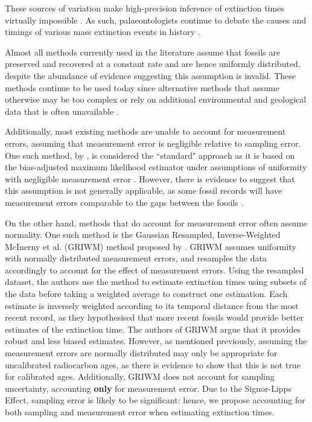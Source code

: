 These sources of variation make high-precision inference of extinction times virtually impossible \cite{Bradshaw2012}. As such, palaeontologists continue to debate the causes and timings of various mass extinction events in history \cite{Saltre2015}.

Almost all methods currently used in the literature assume that fossils are preserved and recovered at a constant rate and are hence uniformly distributed, despite the abundance of evidence suggesting this assumption is invalid. These methods continue to be used today since alternative methods that assume otherwise may be too complex or rely on additional environmental and geological data that is often unavailable \cite{WangMarshall2016}.

Additionally, most existing methods are unable to account for measurement errors, assuming that measurement error is negligible relative to sampling error. One such method, by \citet{Strauss1989}, is considered the ``standard" approach as it is based on the bias-adjusted maximum likelihood estimator under assumptions of uniformity with negligible measurement error \cite{WangMarshall2016}. However, there is evidence to suggest that this assumption is not generally applicable, as some fossil records will have measurement errors comparable to the gaps between the fossils \cite{Solow2006}.

On the other hand, methods that do account for measurement error often assume normality. One such method is the Gaussian Resampled, Inverse-Weighted McInerny et al. (GRIWM) method proposed by \citet{Bradshaw2012}. GRIWM assumes uniformity with normally distributed measurement errors, and resamples the data accordingly to account for the effect of measurement errors. Using the resampled dataset, the authors use the \citet{Mcinerny2006} method to estimate extinction times using subsets of the data before taking a weighted average to construct one estimation. Each estimate is inversely weighted according to its temporal distance from the most recent record, as they hypothesised that more recent fossils would provide better estimates of the extinction time. The authors of GRIWM argue that it provides robust and less biased estimates. However, as mentioned previously, assuming the measurement errors are normally distributed may only be appropriate for uncalibrated radiocarbon ages, as there is evidence to show that this is not true for calibrated ages. Additionally, GRIWM does not account for sampling uncertainty, accounting \textbf{only} for measurement error. Due to the Signor-Lipps Effect, sampling error is likely to be significant: hence, we propose accounting for both sampling and measurement error when estimating extinction times.


